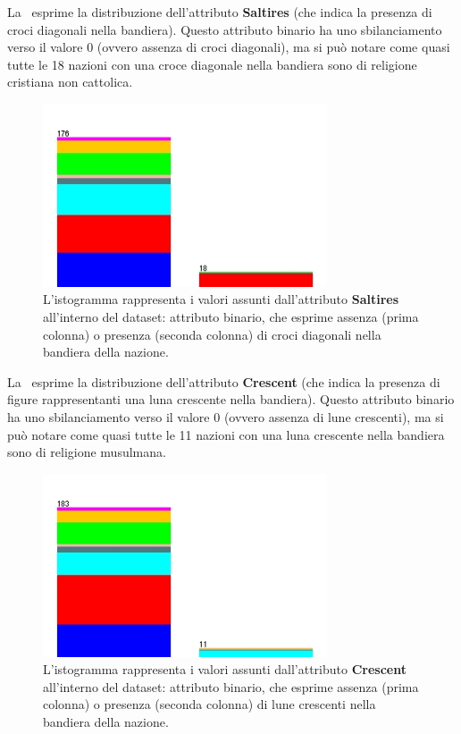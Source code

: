 \documentclass[a4paper,11pt,twoside,notitlepage,final]{scrartcl}
\begin{document}
La~ esprime la distribuzione dell'attributo \textbf{Saltires} (che indica la presenza di croci diagonali nella bandiera).
Questo attributo binario ha uno sbilanciamento verso il valore 0 (ovvero assenza di croci diagonali), ma si può notare come quasi tutte le 18 nazioni con
una croce diagonale nella bandiera sono di religione cristiana non cattolica.

\begin{figure}[H]
  \centering
  \includegraphics[width=0.75\textwidth]{fig/religion-saltires.jpg}%
  \caption{%
    L'istogramma rappresenta i valori assunti dall'attributo \textbf{Saltires}
    all'interno del dataset: attributo binario, che esprime assenza (prima colonna) o presenza (seconda colonna) di croci diagonali nella bandiera della nazione.
    }%
  \label{fig:saltires}
\end{figure}

La~ esprime la distribuzione dell'attributo \textbf{Crescent} (che indica la presenza di figure rappresentanti una luna crescente nella bandiera).
Questo attributo binario ha uno sbilanciamento verso il valore 0 (ovvero assenza di lune crescenti), ma si può notare come quasi tutte le 11 nazioni con
una luna crescente nella bandiera sono di religione musulmana.

\begin{figure}[H]
  \centering
  \includegraphics[width=0.75\textwidth]{fig/religion-crescent.jpg}%
  \caption{%
    L'istogramma rappresenta i valori assunti dall'attributo \textbf{Crescent}
    all'interno del dataset: attributo binario, che esprime assenza (prima colonna) o presenza (seconda colonna) di lune crescenti nella bandiera della nazione.
    }%
  \label{fig:crescent}
\end{figure}
\end{document}
